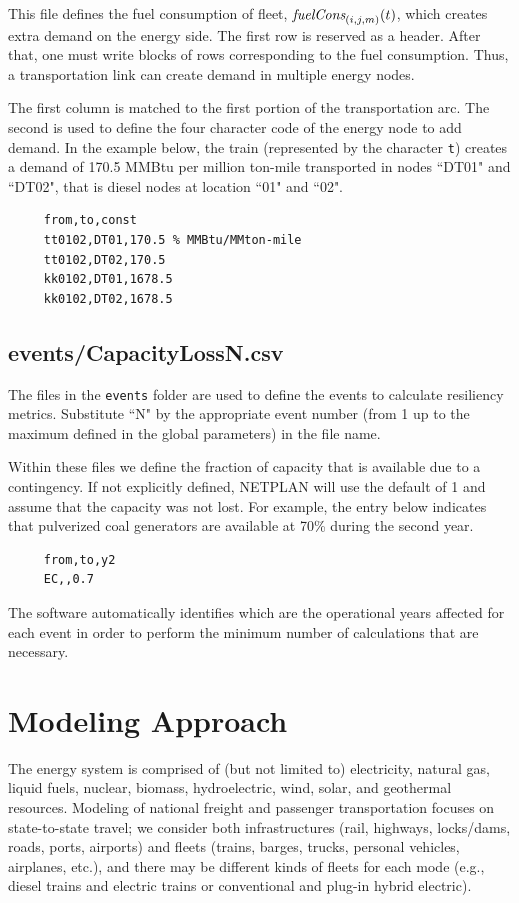 \documentclass{article}
\begin{document}
This file defines the fuel consumption of fleet, $\emph{fuelCons}_{(i,j,m)}(t)$, which creates extra demand on the energy side. The first row is reserved as a header. After that, one must write blocks of rows corresponding to the fuel consumption. Thus, a transportation link can create demand in multiple energy nodes.

The first column is matched to the first portion of the transportation arc. The second is used to define the four character code of the energy node to add demand. In the example below, the train (represented by the character \verb=t=) creates a demand of 170.5 MMBtu per million ton-mile transported in nodes ``DT01" and ``DT02", that is diesel nodes at location ``01" and ``02".

\begin{verbatim}
     from,to,const
     tt0102,DT01,170.5 % MMBtu/MMton-mile
     tt0102,DT02,170.5
     kk0102,DT01,1678.5
     kk0102,DT02,1678.5
\end{verbatim}


\subsection{events/CapacityLossN.csv}

The files in the \verb=events= folder are used to define the events to calculate resiliency metrics. Substitute ``N" by the appropriate event number (from 1 up to the maximum defined in the global parameters) in the file name.

Within these files we define the fraction of capacity that is available due to a contingency. If not explicitly defined, NETPLAN will use the default of 1 and assume that the capacity was not lost. For example, the entry below indicates that pulverized coal generators are available at 70\% during the second year.

\begin{verbatim}
     from,to,y2
     EC,,0.7
\end{verbatim}

The software automatically identifies which are the operational years affected for each event in order to perform the minimum number of calculations that are necessary.


\section{Modeling Approach} \label{sec:approach}

The energy system is comprised of (but not limited to) electricity, natural gas, liquid fuels, nuclear, biomass, hydroelectric, wind, solar, and geothermal resources. Modeling of national freight and passenger transportation focuses on state-to-state travel; we consider both infrastructures (rail, highways, locks/dams, roads, ports, airports) and fleets (trains, barges, trucks, personal vehicles, airplanes, etc.), and there may be different kinds of fleets for each mode (e.g., diesel trains and electric trains or conventional and plug-in hybrid electric).
\end{document}
